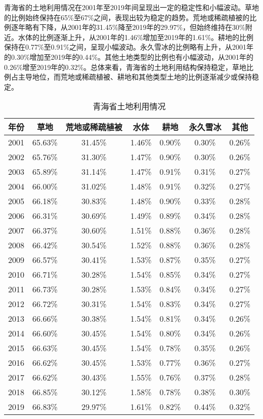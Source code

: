 \documentclass{article}
\begin{document}
		青海省的土地利用情况在2001年至2019年间呈现出一定的稳定性和小幅波动。草地的比例始终保持在65\%至67\%之间，表现出较为稳定的趋势。荒地或稀疏植被的比例逐年略有下降，从2001年的31.45\%降至2019年的29.97\%，但始终维持在30\%附近。水体的比例逐渐上升，从2001年的1.46\%增加至2019年的1.61\%。耕地的比例保持在0.77\%至0.91\%之间，呈现小幅波动。永久雪冰的比例略有上升，从2001年的0.30\%增加至2019年的0.44\%。其他土地类型的比例也有小幅波动，从2001年的0.26\%增至2019年的0.32\%。总体来看，青海省的土地利用结构保持稳定，草地比例占主导地位，而荒地或稀疏植被、耕地和其他类型土地的比例逐渐减少或保持稳定。
		
		\begin{table}[H]
			\centering
			\caption{青海省土地利用情况}
			\begin{tabular}{|c|c|c|c|c|c|c|}
				\hline
				年份 & 草地 & 荒地或稀疏植被 & 水体 & 耕地 & 永久雪冰 & 其他 \\
				\hline
				2001 & 65.63\% & 31.45\% & 1.46\% & 0.90\% & 0.30\% & 0.26\% \\
				2002 & 65.76\% & 31.30\% & 1.47\% & 0.90\% & 0.30\% & 0.26\% \\
				2003 & 65.89\% & 31.14\% & 1.47\% & 0.91\% & 0.31\% & 0.27\% \\
				2004 & 66.00\% & 31.02\% & 1.48\% & 0.91\% & 0.32\% & 0.27\% \\
				2005 & 66.18\% & 30.83\% & 1.48\% & 0.90\% & 0.33\% & 0.28\% \\
				2006 & 66.31\% & 30.69\% & 1.49\% & 0.89\% & 0.34\% & 0.28\% \\
				2007 & 66.37\% & 30.60\% & 1.51\% & 0.88\% & 0.36\% & 0.28\% \\
				2008 & 66.42\% & 30.54\% & 1.52\% & 0.88\% & 0.36\% & 0.28\% \\
				2009 & 66.57\% & 30.41\% & 1.53\% & 0.87\% & 0.35\% & 0.27\% \\
				2010 & 66.71\% & 30.28\% & 1.54\% & 0.85\% & 0.34\% & 0.27\% \\
				2011 & 66.73\% & 30.28\% & 1.53\% & 0.84\% & 0.34\% & 0.27\% \\
				2012 & 66.72\% & 30.31\% & 1.54\% & 0.83\% & 0.34\% & 0.27\% \\
				2013 & 66.66\% & 30.38\% & 1.54\% & 0.81\% & 0.34\% & 0.26\% \\
				2014 & 66.60\% & 30.45\% & 1.54\% & 0.80\% & 0.34\% & 0.26\% \\
				2015 & 66.63\% & 30.45\% & 1.54\% & 0.78\% & 0.35\% & 0.26\% \\
				2016 & 66.62\% & 30.45\% & 1.53\% & 0.77\% & 0.36\% & 0.27\% \\
				2017 & 66.62\% & 30.43\% & 1.55\% & 0.76\% & 0.37\% & 0.28\% \\
				2018 & 66.85\% & 30.12\% & 1.58\% & 0.78\% & 0.38\% & 0.30\% \\
				2019 & 66.83\% & 29.97\% & 1.61\% & 0.82\% & 0.44\% & 0.32\% \\
				\hline
			\end{tabular}
		\end{table}
		
\end{document}
